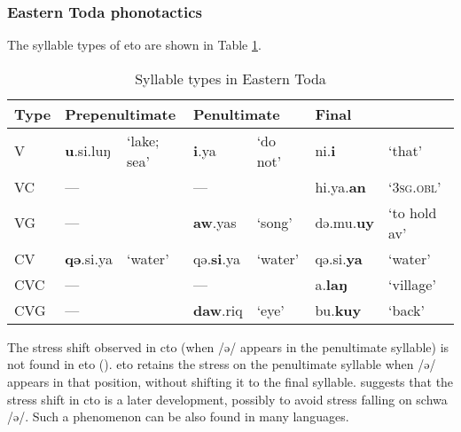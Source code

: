 \subsubsection{Eastern Toda phonotactics} \label{sec:eto_phonotactics}


The syllable types of \acl{eto} are shown in Table \ref{tab:sy_ty_eto}. 

\begin{table}[!htbp]
\centering
\caption{Syllable types in Eastern Toda}
\label{tab:sy_ty_eto}
\begin{tabular}{lllllll}
\hline
Type & \multicolumn{2}{l}{Prepenultimate} & \multicolumn{2}{l}{Penultimate} & \multicolumn{2}{l}{Final}                \\ \hline
V             & \textbf{u}.si.luŋ & `lake; sea'    & \textbf{i}.ya            & `do not'         & ni.\textbf{i}        & `that' \\
VC            & ---              &                 & ---             &               & hi.ya.\textbf{an}       & `\textsc{3sg.obl}'           \\
VG            & ---              &                 & \textbf{aw}.yas   & `song' & də.mu.\textbf{uy} &  `to hold \acs{av}'        \\
CV            & \textbf{qə}.si.ya         & `water'         & qə.\textbf{si}.ya        & `water'       & qə.si.\textbf{ya}    & `water'                    \\
CVC           & ---              &                 & ---             &               & a.\textbf{laŋ}      & `village'                    \\
CVG           & ---              &                 & \textbf{daw}.riq     & `eye'    & bu.\textbf{kuy}      & `back'                     \\ \hline
\end{tabular}
\end{table}



The stress shift observed in \acl{cto} (when /ə/ appears in the penultimate syllable) is not found in \acl{eto} (\cite[96--97]{lee2015tawsa}). \acl{eto} retains the stress on the penultimate syllable when /ə/ appears in that position, without shifting it to the final syllable. \textcite[97]{lee2015tawsa} suggests that the stress shift in \acl{cto} is a later development, possibly to avoid stress falling on schwa /ə/. Such a phenomenon can be also found in many languages.

